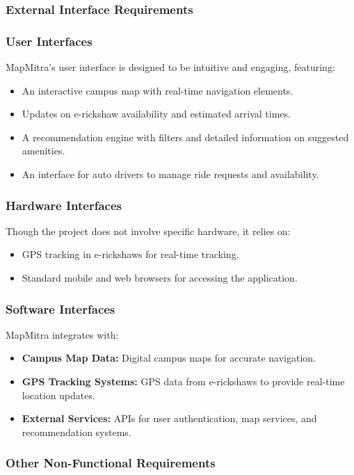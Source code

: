 \subsubsection{External Interface Requirements}

\subsubsection*{User Interfaces}
MapMitra's user interface is designed to be intuitive and engaging, featuring:
\begin{itemize}
	\item An interactive campus map with real-time navigation elements.
	\item Updates on e-rickshaw availability and estimated arrival times.
	\item A recommendation engine with filters and detailed information on suggested amenities.
	\item An interface for auto drivers to manage ride requests and availability.
\end{itemize}

\subsubsection*{Hardware Interfaces}
Though the project does not involve specific hardware, it relies on:
\begin{itemize}
	\item GPS tracking in e-rickshaws for real-time tracking.
	\item Standard mobile and web browsers for accessing the application.
\end{itemize}

\subsubsection*{Software Interfaces}
MapMitra integrates with:
\begin{itemize}
	\item \textbf{Campus Map Data:} Digital campus maps for accurate navigation.
	\item \textbf{GPS Tracking Systems:} GPS data from e-rickshaws to provide real-time location updates.
	\item \textbf{External Services:} APIs for user authentication, map services, and recommendation systems.
\end{itemize}

\subsubsection{Other Non-Functional Requirements}


